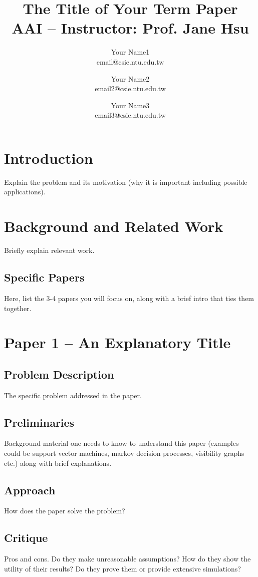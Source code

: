 \documentclass[12pt]{article}
\title{The Title of Your Term Paper \\ {\small AAI --
    Instructor: Prof. Jane Hsu}}
\author{Your Name1 \\ email@csie.ntu.edu.tw \and Your Name2 \\ email2@csie.ntu.edu.tw \and Your Name3 \\ email3@csie.ntu.edu.tw}
\begin{document}
\maketitle

\section{Introduction}

Explain the problem and its motivation (why it is important including possible
applications).

\section{Background and Related Work}

Briefly explain relevant work.

\subsection{Specific Papers}
Here, list the 3-4 papers you will focus on, along with a brief intro
that ties them together.


\section{Paper 1 -- An Explanatory Title}
\subsection{Problem Description}
The specific problem addressed in the paper.

\subsection{Preliminaries}
Background material one needs to know to understand this paper
(examples could be support vector machines, markov decision processes,
visibility graphs etc.) along with brief explanations.


\subsection{Approach}
How does the paper solve the problem?

\subsection{Critique}
Pros and cons. Do they make unreasonable assumptions? How do they show
the utility of their results? Do they prove them or provide extensive simulations?
\end{document}
